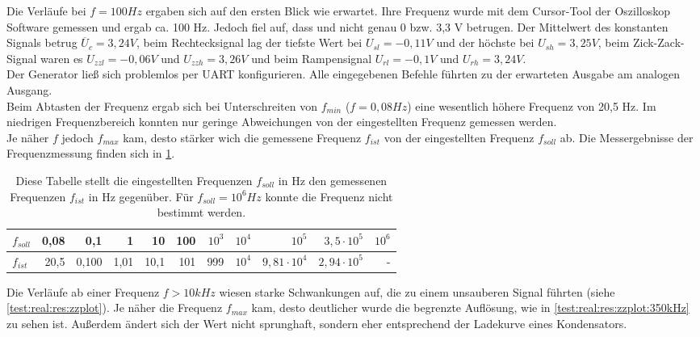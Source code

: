 Die Verläufe bei $f = 100Hz$ ergaben sich auf den ersten Blick wie erwartet.
Ihre Frequenz wurde mit dem Cursor-Tool der Oszilloskop Software gemessen und ergab ca. 100 Hz.
Jedoch fiel auf, dass  und  nicht genau 0 bzw. 3,3 V betrugen.
Der Mittelwert des konstanten Signals betrug $\overline{U}_{c}=3,24 V$, beim Rechtecksignal lag der tiefste Wert bei $U_{sl} = -0,11 V$ und der höchste bei $U_{sh} = 3,25 V$, beim Zick-Zack-Signal waren es $U_{zzl} = -0,06 V$ und $U_{zzh} = 3,26 V$ und beim Rampensignal $U_{rl} = -0,1 V$ und $U_{rh} = 3,24 V$. \\
Der Generator ließ sich problemlos per UART konfigurieren.
Alle eingegebenen Befehle führten zu der erwarteten Ausgabe am analogen Ausgang.\\
Beim Abtasten der Frequenz  ergab sich bei Unterschreiten von $f_{min}$ ($f = 0,08Hz$) eine wesentlich höhere Frequenz von 20,5 Hz. 
Im niedrigen Frequenzbereich konnten nur geringe Abweichungen von der eingestellten Frequenz gemessen werden. \\
Je näher $f$ jedoch $f_{max}$ kam, desto stärker wich die gemessene Frequenz $f_{ist}$ von der eingestellten Frequenz $f_{soll}$ ab.
Die Messergebnisse der Frequenzmessung finden sich in \cref{test:real:res:ftab}.

\begin{table}[h]
  \begin{tabular}[h]{|l|r|r|r|r|r|r|r|r|r|r|}
    \hline
    $f_{soll}$ & 0,08 & 0,1 & 1 & 10 & 100 & $10^3$ & $10^4$ & $10^5$ & $3,5 \cdot 10^5$ & $10^6$\\ \hline
    $f_{ist}$ & 20,5 & 0,100 & 1,01& 10,1 & 101 & 999 & $10^4$ & $9,81 \cdot 10^4$ & $2,94 \cdot 10^5$ & - \\ \hline
  \end{tabular}
  \caption{Diese Tabelle stellt die eingestellten Frequenzen $f_{soll}$ in Hz den gemessenen Frequenzen $f_{ist}$ in Hz gegenüber. Für $f_{soll} = 10^6 Hz$ konnte die Frequenz nicht bestimmt werden.} \label{test:real:res:ftab}
\end{table}

Die Verläufe ab einer Frequenz $f > 10 kHz$ wiesen starke Schwankungen auf, die zu einem unsauberen Signal führten (siehe \cref{test:real:res:zzplot}).
Je näher die Frequenz $f_{max}$ kam, desto deutlicher wurde die begrenzte Auflösung, wie in \cref{test:real:res:zzplot:350kHz} zu sehen ist.
Außerdem ändert sich der Wert nicht sprunghaft, sondern eher entsprechend der Ladekurve eines Kondensators.

